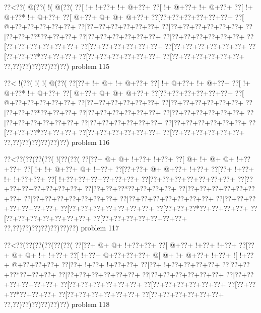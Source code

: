 \vbox{\vbox{\goo
\0??<\0??(\- @(\0??(\- !(\- @(\0??(
\0??[\- !+\- !+\0??+\- !+\- @+\0??+
\0??[\- !+\- @+\0??+\- !+\- @+\0??+
\0??[\- !+\- @+\0??*\- !+\- @+\0??+
\0??[\- @+\0??+\- @+\- @+\- @+\0??+
\0??[\0??+\0??+\0??+\0??+\0??+\0??+
\0??[\- @+\0??+\0??+\0??+\0??+\0??+
\0??[\0??+\0??+\0??+\0??+\0??+\0??+
\0??[\0??+\0??+\0??+\0??+\0??+\0??+
\0??[\0??+\0??+\0??*\0??+\0??+\0??+
\0??[\0??+\0??+\0??+\0??+\0??+\0??+
\0??[\0??+\0??+\0??+\0??+\0??+\0??+
\0??[\0??+\0??+\0??+\0??+\0??+\0??+
\0??[\0??+\0??+\0??+\0??+\0??+\0??+
\0??[\0??+\0??+\0??+\0??+\0??+\0??+
\0??[\0??+\0??+\0??*\0??+\0??+\0??+
\0??[\0??+\0??+\0??+\0??+\0??+\0??+
\0??[\0??+\0??+\0??+\0??+\0??+\0??+
\0??,\0??)\0??)\0??)\0??)\0??)\0??)
}
\hfil problem 115\hfil\break
}

\vbox{\vbox{\goo
\0??<\- !(\0??(\- !(\- !(\- @(\0??(
\0??[\0??+\- !+\- @+\- !+\- @+\0??+
\0??[\- !+\- @+\0??+\- !+\- @+\0??+
\0??[\- !+\- @+\0??*\- !+\- @+\0??+
\0??[\- @+\0??+\- @+\- @+\- @+\0??+
\0??[\0??+\0??+\0??+\0??+\0??+\0??+
\0??[\- @+\0??+\0??+\0??+\0??+\0??+
\0??[\0??+\0??+\0??+\0??+\0??+\0??+
\0??[\0??+\0??+\0??+\0??+\0??+\0??+
\0??[\0??+\0??+\0??*\0??+\0??+\0??+
\0??[\0??+\0??+\0??+\0??+\0??+\0??+
\0??[\0??+\0??+\0??+\0??+\0??+\0??+
\0??[\0??+\0??+\0??+\0??+\0??+\0??+
\0??[\0??+\0??+\0??+\0??+\0??+\0??+
\0??[\0??+\0??+\0??+\0??+\0??+\0??+
\0??[\0??+\0??+\0??*\0??+\0??+\0??+
\0??[\0??+\0??+\0??+\0??+\0??+\0??+
\0??[\0??+\0??+\0??+\0??+\0??+\0??+
\0??,\0??)\0??)\0??)\0??)\0??)\0??)
}
\hfil problem 116\hfil\break
}

\vbox{\vbox{\goo
\0??<\0??(\0??(\0??(\0??(\- !(\0??(\0??(
\0??[\0??+\- @+\- @+\- !+\0??+\- !+\0??+
\0??[\- @+\- !+\- @+\- @+\- !+\0??+\0??+
\0??[\- !+\- !+\- @+\0??+\- @+\- !+\0??+
\0??[\0??+\0??+\- @+\- @+\0??+\- !+\0??+
\0??[\0??+\- !+\0??+\- !+\- !+\0??+\0??+
\0??[\- !+\0??+\0??+\0??+\0??+\0??+\0??+
\0??[\0??+\0??+\0??+\0??+\0??+\0??+\0??+
\0??[\0??+\0??+\0??+\0??+\0??+\0??+\0??+
\0??[\0??+\0??+\0??*\0??+\0??+\0??+\0??+
\0??[\0??+\0??+\0??+\0??+\0??+\0??+\0??+
\0??[\0??+\0??+\0??+\0??+\0??+\0??+\0??+
\0??[\0??+\0??+\0??+\0??+\0??+\0??+\0??+
\0??[\0??+\0??+\0??+\0??+\0??+\0??+\0??+
\0??[\0??+\0??+\0??+\0??+\0??+\0??+\0??+
\0??[\0??+\0??+\0??*\0??+\0??+\0??+\0??+
\0??[\0??+\0??+\0??+\0??+\0??+\0??+\0??+
\0??[\0??+\0??+\0??+\0??+\0??+\0??+\0??+
\0??,\0??)\0??)\0??)\0??)\0??)\0??)\0??)
}
\hfil problem 117\hfil\break
}

\vbox{\vbox{\goo
\0??<\0??(\0??(\0??(\0??(\0??(\0??(
\0??[\0??+\- @+\- @+\- !+\0??+\0??+
\0??[\- @+\0??+\- !+\0??+\- !+\0??+
\0??[\0??+\- @+\- @+\- !+\- !+\0??+
\0??[\- !+\0??+\- @+\0??+\0??+\0??+
\- @[\- @+\- !+\- @+\0??+\- !+\0??+
\- ![\- !+\0??+\- @+\0??+\0??+\0??+
\0??[\0??+\- !+\0??+\- !+\0??+\0??+
\0??[\0??+\- !+\0??+\0??+\0??+\0??+
\0??[\0??+\0??+\0??*\0??+\0??+\0??+
\0??[\0??+\0??+\0??+\0??+\0??+\0??+
\0??[\0??+\0??+\0??+\0??+\0??+\0??+
\0??[\0??+\0??+\0??+\0??+\0??+\0??+
\0??[\0??+\0??+\0??+\0??+\0??+\0??+
\0??[\0??+\0??+\0??+\0??+\0??+\0??+
\0??[\0??+\0??+\0??*\0??+\0??+\0??+
\0??[\0??+\0??+\0??+\0??+\0??+\0??+
\0??[\0??+\0??+\0??+\0??+\0??+\0??+
\0??,\0??)\0??)\0??)\0??)\0??)\0??)
}
\hfil problem 118\hfil\break
}

